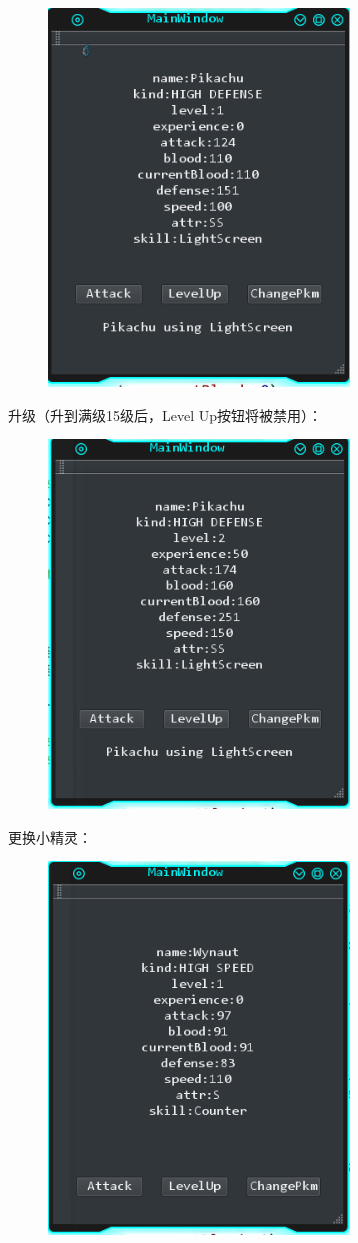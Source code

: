 \documentclass{ctexart}
\begin{document}
\begin{figure}[H]
  \centering
  \includegraphics[width=8cm]{stage1-skill.png}
\end{figure}
\pagebreak[4]
升级（升到满级15级后，Level Up按钮将被禁用）：
\begin{figure}[H]
  \centering
  \includegraphics[width=8cm]{stage1-levelUp.png}
\end{figure}
更换小精灵：
\begin{figure}[H]
  \centering
  \includegraphics[width=8cm]{stage1-changePkm.png}
\end{figure}
\end{document}
